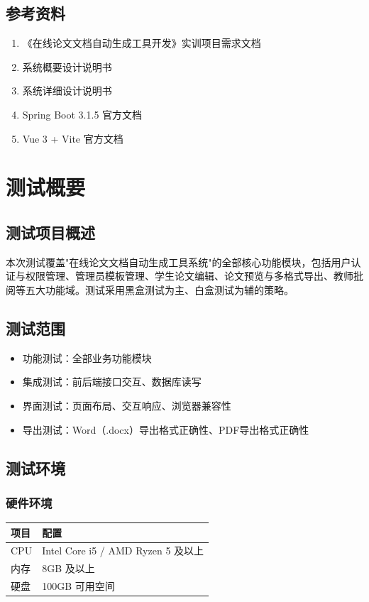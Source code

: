 \documentclass[a4paper,12pt]{article}
\begin{document}
\subsection{参考资料}
\begin{enumerate}
  \item 《在线论文文档自动生成工具开发》实训项目需求文档
  \item 系统概要设计说明书
  \item 系统详细设计说明书
  \item Spring Boot 3.1.5 官方文档
  \item Vue 3 + Vite 官方文档
\end{enumerate}

\section{测试概要}
\subsection{测试项目概述}
本次测试覆盖"在线论文文档自动生成工具系统"的全部核心功能模块，包括用户认证与权限管理、管理员模板管理、学生论文编辑、论文预览与多格式导出、教师批阅等五大功能域。测试采用黑盒测试为主、白盒测试为辅的策略。

\subsection{测试范围}
\begin{itemize}
  \item 功能测试：全部业务功能模块
  \item 集成测试：前后端接口交互、数据库读写
  \item 界面测试：页面布局、交互响应、浏览器兼容性
  \item 导出测试：Word（.docx）导出格式正确性、PDF导出格式正确性
\end{itemize}

\subsection{测试环境}
\subsubsection{硬件环境}
\begin{center}
\begin{tabular}{|l|l|}
\hline
项目 & 配置 \\
\hline
CPU & Intel Core i5 / AMD Ryzen 5 及以上 \\
内存 & 8GB 及以上 \\
硬盘 & 100GB 可用空间 \\
\hline
\end{tabular}
\end{center}
\end{document}
